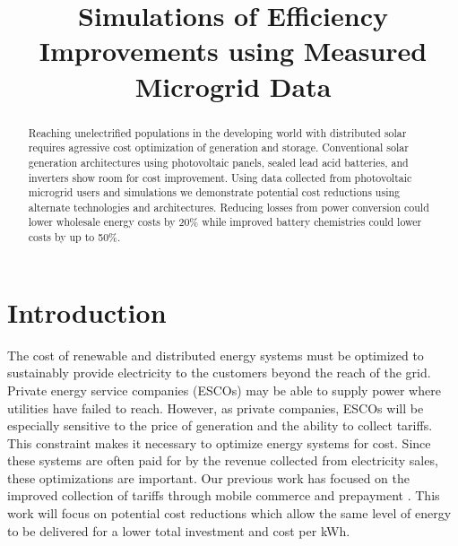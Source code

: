 \documentclass[conference]{IEEEtran}
\title{Simulations of Efficiency Improvements using Measured Microgrid Data}
\begin{document}
\author{
\and
{}
}

\maketitle

\begin{abstract}
Reaching unelectrified populations in the developing world
with distributed solar requires agressive cost optimization of
generation and storage. 
Conventional solar generation architectures using photovoltaic
panels, sealed lead acid batteries, and inverters show room for
cost improvement.
Using data collected from photovoltaic microgrid users and simulations
we demonstrate potential cost reductions using alternate 
technologies and architectures.
Reducing losses from power conversion could lower wholesale energy
costs by 20\% while improved battery chemistries could lower
costs by up to 50\%. 
\end{abstract}

\section{Introduction}

The cost of renewable and distributed energy systems must be
optimized to sustainably provide electricity to the customers 
beyond the reach of the grid.
Private energy service companies (ESCOs) may be able to supply power
where utilities have failed to reach.
However, as private companies, ESCOs will be especially sensitive
to the price of generation and the ability to collect
tariffs.
This constraint makes it necessary to optimize energy systems
for cost.
Since these systems are often paid for by the revenue collected
from electricity sales, these optimizations are important.
\cite{fee for service literature}
Our previous work has focused on the improved collection of 
tariffs through mobile commerce and prepayment \cite{ICTD}.
This work will focus on potential cost reductions which allow
the same level of energy to be delivered for a lower total
investment and cost per kWh.
\end{document}
